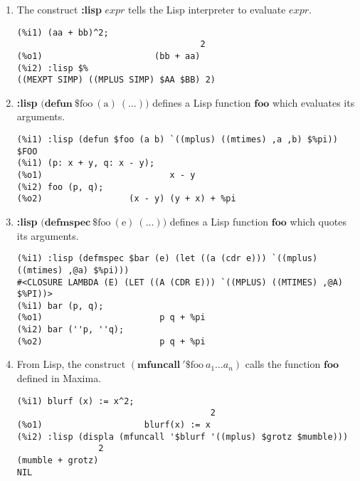 \documentclass[12pt]{article}
\begin{document}
\begin{enumerate}

\item The construct {\bf :lisp} $\mathit{expr}$ tells the Lisp interpreter
to evaluate $\mathit{expr}$.

\begin{verbatim}
(%i1) (aa + bb)^2;
                                    2
(%o1)                      (bb + aa)
(%i2) :lisp $%
((MEXPT SIMP) ((MPLUS SIMP) $AA $BB) 2)
\end{verbatim}

\item {\bf :lisp} $\mathrm{(}\mathbf{defun\ } \mathrm{\$foo\ (a)\ (\ldots))}$
defines a Lisp function $\mathbf{foo}$ which evaluates its arguments.

\begin{verbatim}
(%i1) :lisp (defun $foo (a b) `((mplus) ((mtimes) ,a ,b) $%pi))
$FOO
(%i1) (p: x + y, q: x - y);
(%o1)                         x - y
(%i2) foo (p, q);
(%o2)                 (x - y) (y + x) + %pi
\end{verbatim}

\item {\bf :lisp} $\mathrm{(}\mathbf{defmspec\ } \mathrm{\$foo\ (e)\ (\ldots))}$
defines a Lisp function $\mathbf{foo}$ which quotes its arguments.
\begin{verbatim}
(%i1) :lisp (defmspec $bar (e) (let ((a (cdr e))) `((mplus) ((mtimes) ,@a) $%pi)))
#<CLOSURE LAMBDA (E) (LET ((A (CDR E))) `((MPLUS) ((MTIMES) ,@A) $%PI))>
(%i1) bar (p, q);
(%o1)                       p q + %pi
(%i2) bar (''p, ''q);
(%o2)                       p q + %pi
\end{verbatim}

\item From Lisp, the construct $(\mathbf{mfuncall\ '\$}\mathrm{foo\ }a_1 \ldots a_n)$
calls the function $\mathbf{foo}$ defined in Maxima.

\begin{verbatim}
(%i1) blurf (x) := x^2;
                                      2
(%o1)                    blurf(x) := x
(%i2) :lisp (displa (mfuncall '$blurf '((mplus) $grotz $mumble)))
                2
(mumble + grotz)
NIL
\end{verbatim}

\end{enumerate}
\end{document}
